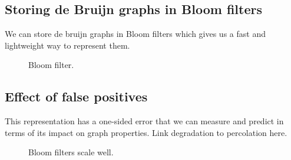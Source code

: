 \documentclass[12pt]{article} \usepackage{simplemargins}
\begin{document}
\subsection{Storing de Bruijn graphs in Bloom filters}

We can store de bruijn graphs in Bloom filters which gives us a fast and lightweight way to represent them.

\begin{figure}
\caption{Bloom filter.}
\end{figure}

\subsection{Effect of false positives}

This representation has a one-sided error that we can measure and
predict in terms of its impact on graph properties.  Link degradation
to percolation here.

\begin{figure}
\caption{Bloom filters scale well.}
\end{figure}
\end{document}
